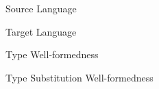 



\begin{figure}%
      \centering
      \begin{framed}
        
      \end{framed}
      \caption{Source Language}
      \label{fig:sourcelanglong}
\end{figure}


\begin{figure}%
      \centering
      \begin{framed}
        
      \end{framed}
      \caption{Target Language}
\end{figure}

\begin{figure}%
  \label{fig:srctyp}
  \fbox{$\iswf{\stenv}{\stau}$}
  \begin{framed}
    
  \end{framed}
  \caption{Type Well-formedness}
\end{figure}

\begin{figure}%
  \label{fig:srctyp}
  \fbox{$\iswf{\stenv}{\stau}$}
  \begin{framed}
    
  \end{framed}
  \caption{Type Substitution Well-formedness}
\end{figure}


